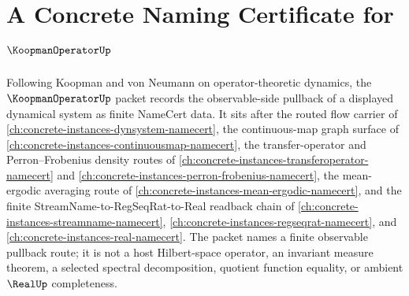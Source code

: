 \chapter{A Concrete Naming Certificate for $\KoopmanOperatorUp$}
\label{ch:concrete-instances-koopman-operator-namecert}

Following Koopman and von Neumann on operator-theoretic dynamics, the $\KoopmanOperatorUp$ packet records the observable-side pullback of a displayed dynamical system as finite NameCert data. It sits after the routed flow carrier of \autoref{ch:concrete-instances-dynsystem-namecert}, the continuous-map graph surface of \autoref{ch:concrete-instances-continuousmap-namecert}, the transfer-operator and Perron--Frobenius density routes of \autoref{ch:concrete-instances-transferoperator-namecert} and \autoref{ch:concrete-instances-perron-frobenius-namecert}, the mean-ergodic averaging route of \autoref{ch:concrete-instances-mean-ergodic-namecert}, and the finite StreamName-to-RegSeqRat-to-Real readback chain of \autoref{ch:concrete-instances-streamname-namecert}, \autoref{ch:concrete-instances-regseqrat-namecert}, and \autoref{ch:concrete-instances-real-namecert}. The packet names a finite observable pullback route; it is not a host Hilbert-space operator, an invariant measure theorem, a selected spectral decomposition, quotient function equality, or ambient $\RealUp$ completeness.

